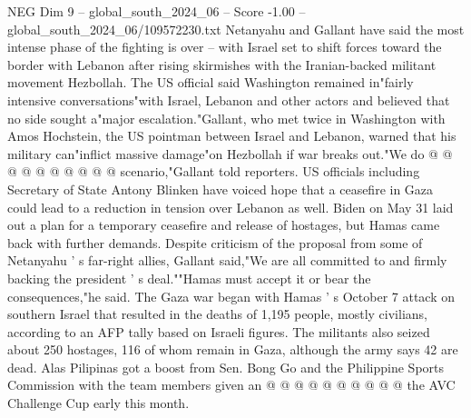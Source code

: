 \begin{textsample}{NEG Dim 9 – global\_south\_2024\_06 – Score -1.00 – global\_south\_2024\_06/109572230.txt}
Netanyahu and Gallant have said the most intense phase of the fighting is over -- with Israel set to shift forces toward the border with Lebanon after rising skirmishes with the Iranian-backed militant movement Hezbollah.
The US official said Washington remained in"fairly intensive conversations"with Israel, Lebanon and other actors and believed that no side sought a"major escalation."Gallant, who met twice in Washington with Amos Hochstein, the US pointman between Israel and Lebanon, warned that his military can"inflict massive damage"on Hezbollah if war breaks out."We do @ @ @ @ @ @ @ @ @ @ scenario,"Gallant told reporters.
US officials including Secretary of State Antony Blinken have voiced hope that a ceasefire in Gaza could lead to a reduction in tension over Lebanon as well.
Biden on May 31 laid out a plan for a temporary ceasefire and release of hostages, but Hamas came back with further demands.
Despite criticism of the proposal from some of Netanyahu ' s far-right allies, Gallant said,"We are all committed to and firmly backing the president ' s deal.""Hamas must accept it or bear the consequences,"he said.
The Gaza war began with Hamas ' s October 7 attack on southern Israel that resulted in the deaths of 1,195 people, mostly civilians, according to an AFP tally based on Israeli figures.
The militants also seized about 250 hostages, 116 of whom remain in Gaza, although the army says 42 are dead.
Alas Pilipinas got a boost from Sen.
Bong Go and the Philippine Sports Commission with the team members given an @ @ @ @ @ @ @ @ @ @ the AVC Challenge Cup early this month.

\end{textsample}

